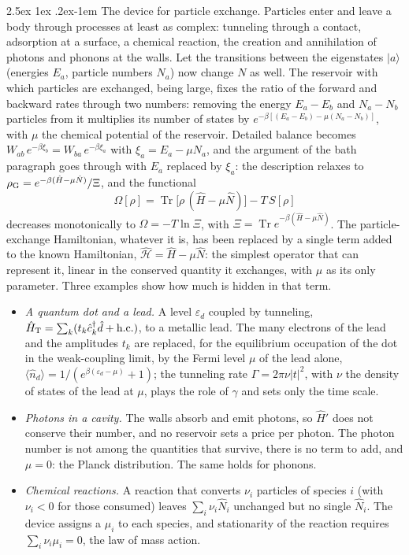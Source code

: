 \documentclass[10pt,a4paper]{article}
\makeatletter
\renewcommand{\paragraph}{\@startsection{paragraph}{4}{\z@}%
  {2.5ex \@plus 1ex \@minus .2ex}{-1em}%
  {\normalfont\fontsize{14pt}{17pt}\selectfont\bfseries}}
\newcommand{\Tr}{\operatorname{Tr}}
\makeatother
\begin{document}
\paragraph{The device for particle exchange.}
Particles enter and leave a body through processes at least as complex: tunneling through a contact, adsorption at a surface, a chemical reaction, the creation and annihilation of photons and phonons at the walls.
Let the transitions between the eigenstates $ |a\rangle $ (energies $ E_a $, particle numbers $ N_a $) now change $ N $ as well.
The reservoir with which particles are exchanged, being large, fixes the ratio of the forward and backward rates through two numbers: removing the energy $ E_a - E_b $ and $ N_a - N_b $ particles from it multiplies its number of states by $ e^{-\beta[(E_a - E_b) - \mu(N_a - N_b)]} $, with $ \mu $ the chemical potential of the reservoir.
Detailed balance becomes $ W_{ab}\,e^{-\beta\xi_b} = W_{ba}\,e^{-\beta\xi_a} $ with $ \xi_a = E_a - \mu N_a $, and the argument of the bath paragraph goes through with $ E_a $ replaced by $ \xi_a $: the description relaxes to $ \rho_{\rm G} = e^{-\beta(\hat H - \mu\hat N)}/\Xi $, and the functional
\[
  \Omega[\rho] = \Tr\big[\rho\,(\hat H - \mu\hat N)\big] - T\,S[\rho]
\]
decreases monotonically to $ \Omega = -T\ln\Xi $, with $ \Xi = \Tr e^{-\beta(\hat H - \mu\hat N)} $.
The particle-exchange Hamiltonian, whatever it is, has been replaced by a single term added to the known Hamiltonian, $ \hat{\mathcal{H}} = \hat H - \mu\hat N $: the simplest operator that can represent it, linear in the conserved quantity it exchanges, with $ \mu $ as its only parameter.
Three examples show how much is hidden in that term.
\begin{itemize}
\item \emph{A quantum dot and a lead.} A level $ \varepsilon_d $ coupled by tunneling, $ \hat H_{\rm T} = \sum_k(t_k\hat c_k^\dagger\hat d + \text{h.c.}) $, to a metallic lead. The many electrons of the lead and the amplitudes $ t_k $ are replaced, for the equilibrium occupation of the dot in the weak-coupling limit, by the Fermi level $ \mu $ of the lead alone, $ \langle\hat n_d\rangle = 1/(e^{\beta(\varepsilon_d - \mu)} + 1) $; the tunneling rate $ \Gamma = 2\pi\nu|t|^{2} $, with $ \nu $ the density of states of the lead at $ \mu $, plays the role of $ \gamma $ and sets only the time scale.
\item \emph{Photons in a cavity.} The walls absorb and emit photons, so $ \hat H' $ does not conserve their number, and no reservoir sets a price per photon. The photon number is not among the quantities that survive, there is no term to add, and $ \mu = 0 $: the Planck distribution. The same holds for phonons.
\item \emph{Chemical reactions.} A reaction that converts $ \nu_i $ particles of species $ i $ (with $ \nu_i < 0 $ for those consumed) leaves $ \sum_i\nu_i\hat N_i $ unchanged but no single $ \hat N_i $. The device assigns a $ \mu_i $ to each species, and stationarity of the reaction requires $ \sum_i\nu_i\mu_i = 0 $, the law of mass action.
\end{itemize}
\end{document}
